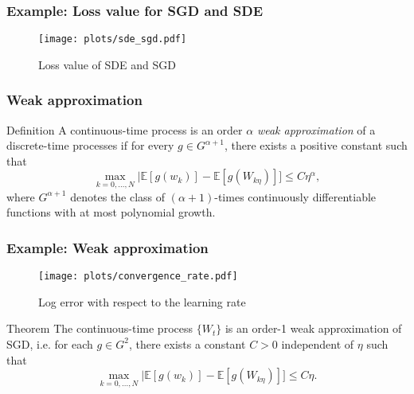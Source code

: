 \documentclass[17pt,institute=e10]{tuhh_presentation}
\newcommand{\E}[1]{\mathbb{E}\left[{#1} \right]}
\begin{document}
\begin{frame}[fragile]
  \frametitle{Example: Loss value for SGD and SDE}
    \vspace{-1cm}
    \begin{figure}
      \hspace*{-4.7cm}
      \texttt{[image: plots/sde\_sgd.pdf]}
      \caption{Loss value of SDE and SGD}
    \end{figure}
\end{frame}

\begin{frame}
  \frametitle{Weak approximation}
\begin{block}{Definition}
  A continuous-time process is an order $\alpha$ \emph{\textcolor{purple-pontifex}{weak approximation}} of a discrete-time processes if for every $g \in G^{\alpha + 1}$, there exists a positive constant such that
  \begin{equation*}
    \max_{k=0,\dots,N} |\E{g(w_k)} - \E{g(W_{k\eta})}] \leq C \eta^\alpha,
  \end{equation*}
  where $G^{\alpha+1}$ denotes the class of $(\alpha+1)$-times continuously differentiable functions with at most polynomial growth.
\end{block}
\end{frame}

\begin{frame}[fragile]
  \frametitle{Example: Weak approximation}
    \vspace{-1cm}
    \begin{figure}
      \centering
      \texttt{[image: plots/convergence\_rate.pdf]}
      \caption{Log error with respect to the learning rate}
    \end{figure}
\end{frame}

\begin{frame}
\begin{block}{Theorem \autocite{liStochasticModifiedEquations2019}}
  The continuous-time process $\{W_t\}$ is an order-1 weak approximation of SGD, i.e. for each $g \in G^2$, there exists a constant $C > 0$ independent of $\eta$ such that
  \begin{equation*}
    \max_{k=0,\dots,N} |\E{g(w_k)} - \E{g(W_{k\eta})}] \leq C \eta.
  \end{equation*}
\end{block}
\end{frame}
\end{document}
